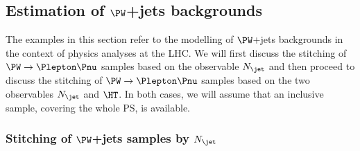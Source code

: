 \subsection{Estimation of \texorpdfstring{$\PW$}{W}+jets backgrounds}
\label{sec:examples_background_yield}

The examples in this section refer to the modelling of 
$\PW$+jets backgrounds in the context of physics analyses at the LHC.
We will first discuss the stitching of $\PW \to \Plepton\Pnu$ samples
based on the observable $N_{\jet}$
and then proceed to discuss the stitching of $\PW \to \Plepton\Pnu$ samples based on the two observables $N_{\jet}$ and $\HT$.
In 
both cases, we will assume that an inclusive sample, covering the whole PS, is available.


\subsubsection{Stitching of \texorpdfstring{$\PW$}{W}+jets samples by \texorpdfstring{$N_{\jet}$}{Njet}}
\label{sec:WJets_vs_Njet}


